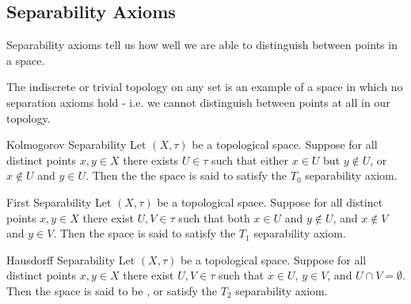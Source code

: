 \documentclass[12pt, a4paper, twoside, openright, titlepage]{book}
\begin{document}
\subsection{Separability Axioms}

\begin{rmk}{}{}
    Separability axioms tell us how well we are able to distinguish between points in a space.
\end{rmk}

\begin{eg}{}{}
    The indiscrete or trivial topology on any set is an example of a space in which no separation axioms hold - i.e. we cannot distinguish between points at all in our topology.
\end{eg}


\begin{defn}{Kolmogorov Separability}{}
    Let $(X,\tau)$ be a topological space. Suppose for all distinct points $x,y \in X$ there exists $U \in \tau$ such that either $x \in U$ but $y \notin U$, or $x \notin U$ and $y \in U$. Then the the space is said to satisfy the $T_0$ separability axiom.
\end{defn}


\begin{defn}{First Separability}{}
    Let $(X,\tau)$ be a topological space. Suppose for all distinct points $x,y \in X$ there exist $U,V \in \tau$ such that both $x \in U$ and $y \notin U$, and $x \notin V$ and $y \in V$. Then the space is said to satisfy the $T_1$ separability axiom.
\end{defn}


\begin{defn}{Hausdorff Separability}{}
    Let $(X,\tau)$ be a topological space. Suppose for all distinct points $x,y \in X$ there exist $U,V \in \tau$ such that $x \in U$, $y \in V$, and $U\cap V = \emptyset$. Then the space is said to be , or satisfy the $T_2$ separability axiom.
\end{defn}
\end{document}
